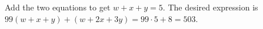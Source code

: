 Add the two equations to get $w+x+y=5$. The desired expression is $99(w+x+y)+(w+2x+3y)=99\cdot5+8=\boxed{503}$.
